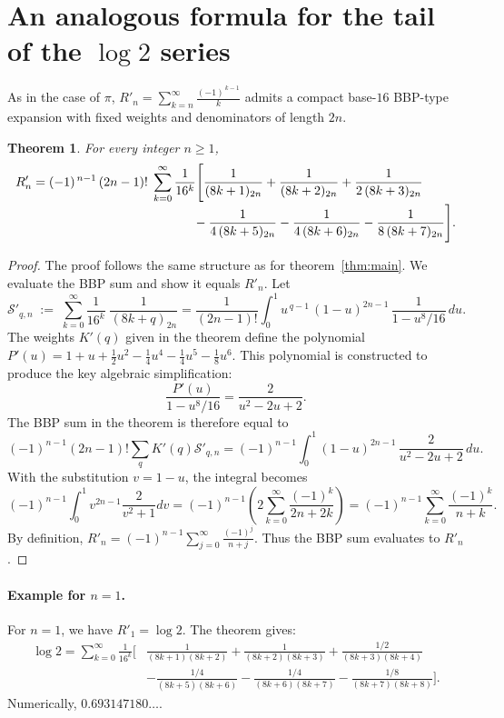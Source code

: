 \documentclass[11pt]{article}
\numberwithin{equation}{section}
\theoremstyle{plain}
\newtheorem{theorem}{Theorem}[section]
\newcommand{\poch}[2]{(#1)_{#2}}      %
\begin{document}
\section{An analogous formula for the tail of the \texorpdfstring{$\log 2$}{log 2} series}\label{sec:log2}

As in the case of $\pi$, $R'_{n} = \sum_{k=n}^{\infty}\frac{(-1)^{\,k-1}}{k}$ admits a compact base-$16$ BBP-type expansion with fixed weights and denominators of length $2n$.

\begin{theorem}\label{thm:log2} For every integer $n\ge1$, 
\begin{align*}
R'_{n} & =(-1)^{\,n-1}\,(2n-1)!\;\sum_{k=0}^{\infty}\frac{1}{16^{k}}\Bigg[\frac{1}{\poch{8k+1}{2n}}+\frac{1}{\poch{8k+2}{2n}}+\frac{1}{2\,\poch{8k+3}{2n}}\\[-0.25em]
 & \hspace{12.7em}-\frac{1}{4\,\poch{8k+5}{2n}}-\frac{1}{4\,\poch{8k+6}{2n}}-\frac{1}{8\,\poch{8k+7}{2n}}\Bigg].
\end{align*}
\end{theorem}
\begin{proof}
The proof follows the same structure as for theorem~\ref{thm:main}. We evaluate the BBP sum and show it equals $R'_n$. Let
\[
\mathcal{S}'_{q,n}\;:=\;\sum_{k=0}^{\infty}\frac{1}{16^{k}}\;\frac{1}{(8k+q)_{2n}}=\frac{1}{(2n-1)!}\int_{0}^{1}u^{\,q-1}\,(1-u)^{2n-1}\,\frac{1}{1-u^{8}/16}\,du.
\]
The weights $K'(q)$ given in the theorem define the polynomial
$P'(u)=1+u+\tfrac{1}{2}u^{2}-\tfrac{1}{4}u^{4}-\tfrac{1}{4}u^{5}-\tfrac{1}{8}u^{6}.$
This polynomial is constructed to produce the key algebraic simplification:
\begin{equation}
\frac{P'(u)}{1-u^8/16} = \frac{2}{u^2-2u+2}.\label{eq:log-reduce}
\end{equation}
The BBP sum in the theorem is therefore equal to
\[
(-1)^{n-1}(2n-1)! \sum_q K'(q) \mathcal{S}'_{q,n} = (-1)^{n-1} \int_{0}^{1}(1-u)^{2n-1}\,\frac{2}{u^2-2u+2}\,du.
\]
With the substitution $v=1-u$, the integral becomes
\[
(-1)^{n-1} \int_0^1 v^{2n-1} \frac{2}{v^2+1} dv = (-1)^{n-1} \left( 2 \sum_{k=0}^\infty \frac{(-1)^k}{2n+2k} \right) = (-1)^{n-1} \sum_{k=0}^\infty \frac{(-1)^k}{n+k}.
\]
By definition, $R'_n = (-1)^{n-1} \sum_{j=0}^\infty \frac{(-1)^j}{n+j}$. Thus the BBP sum evaluates to $R'_n$.
\end{proof}

\paragraph{Example for $n=1$.} For $n=1$, we have $R'_1 = \log 2$. The theorem gives:
\begin{align*}
\log 2 = \sum_{k=0}^{\infty}\frac{1}{16^{k}}\Bigg[&\frac{1}{(8k+1)(8k+2)}+\frac{1}{(8k+2)(8k+3)}+\frac{1/2}{(8k+3)(8k+4)} \\
&-\frac{1/4}{(8k+5)(8k+6)}-\frac{1/4}{(8k+6)(8k+7)}-\frac{1/8}{(8k+7)(8k+8)}\Bigg].
\end{align*}
Numerically, $0.693147180\dots$.
\end{document}
